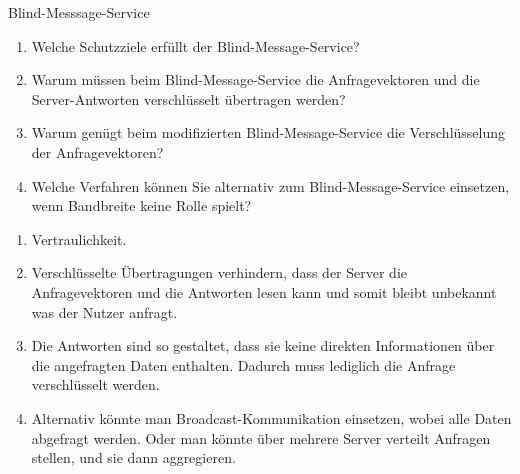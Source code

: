 \documentclass{article}
\begin{document}
\setcounter{subsection}{231}
\begin{exercise}{Blind-Messsage-Service}
  \begin{enumerate}
    \item Welche Schutzziele erfüllt der Blind-Message-Service?
    \item Warum müssen beim Blind-Message-Service die Anfragevektoren und die Server-Antworten verschlüsselt übertragen werden?
    \item Warum genügt beim modifizierten Blind-Message-Service die Verschlüsselung der Anfragevektoren?
    \item Welche Verfahren können Sie alternativ zum Blind-Message-Service einsetzen, wenn Bandbreite keine Rolle spielt?
  \end{enumerate}

  \begin{solution}
    \begin{enumerate}
      \item Vertraulichkeit.
      \item Verschlüsselte Übertragungen verhindern, dass der Server die Anfragevektoren und die Antworten lesen kann und somit bleibt unbekannt was der Nutzer anfragt.
      \item Die Antworten sind so gestaltet, dass sie keine direkten Informationen über die angefragten Daten enthalten. Dadurch muss lediglich die Anfrage verschlüsselt werden.
      \item Alternativ könnte man Broadcast-Kommunikation einsetzen, wobei alle Daten abgefragt werden. Oder man könnte über mehrere Server verteilt Anfragen stellen, und sie dann aggregieren.
    \end{enumerate}
  \end{solution}
\end{exercise}
\end{document}
